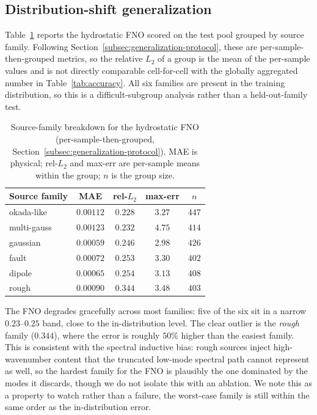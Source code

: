 \subsection{Distribution-shift generalization}
\label{subsec:res-ood}

Table~\ref{tab:ood} reports the hydrostatic FNO scored on the test pool grouped by source family. Following Section~\ref{subsec:generalization-protocol}, these are per-sample-then-grouped metrics, so the relative $L_2$ of a group is the mean of the per-sample values and is not directly comparable cell-for-cell with the globally aggregated number in Table~\ref{tab:accuracy}. All six families are present in the training distribution, so this is a difficult-subgroup analysis rather than a held-out-family test.

\begin{table}[!htbp]
\centering
\caption{Source-family breakdown for the hydrostatic FNO (per-sample-then-grouped, Section~\ref{subsec:generalization-protocol}). MAE is physical; rel-$L_2$ and max-err are per-sample means within the group; $n$ is the group size.}
\label{tab:ood}
\begin{tabular}{lcccc}
    \toprule
    Source family & MAE & rel-$L_2$ & max-err & $n$ \\
    \midrule
    okada-like  & $0.00112$ & $0.228$ & $3.27$ & $447$ \\
    multi-gauss & $0.00123$ & $0.232$ & $4.75$ & $414$ \\
    gaussian    & $0.00059$ & $0.246$ & $2.98$ & $426$ \\
    fault       & $0.00072$ & $0.253$ & $3.30$ & $402$ \\
    dipole      & $0.00065$ & $0.254$ & $3.13$ & $408$ \\
    rough       & $0.00090$ & $\mathbf{0.344}$ & $3.48$ & $403$ \\
    \bottomrule
\end{tabular}
\end{table}

The FNO degrades gracefully across most families: five of the six sit in a narrow $0.23$--$0.25$ band, close to the in-distribution level. The clear outlier is the \emph{rough} family ($0.344$), where the error is roughly $50\%$ higher than the easiest family. This is consistent with the spectral inductive bias: rough sources inject high-wavenumber content that the truncated low-mode spectral path cannot represent as well, so the hardest family for the FNO is plausibly the one dominated by the modes it discards, though we do not isolate this with an ablation. We note this as a property to watch rather than a failure, the worst-case family is still within the same order as the in-distribution error.

